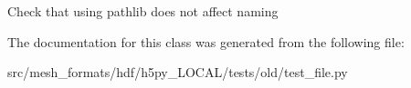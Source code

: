 \begin{DoxyVerb}Check that using pathlib does not affect naming \end{DoxyVerb}
 

The documentation for this class was generated from the following file\+:\begin{DoxyCompactItemize}
\item 
src/mesh\+\_\+formats/hdf/h5py\+\_\+\+L\+O\+C\+A\+L/tests/old/test\+\_\+file.\+py\end{DoxyCompactItemize}
